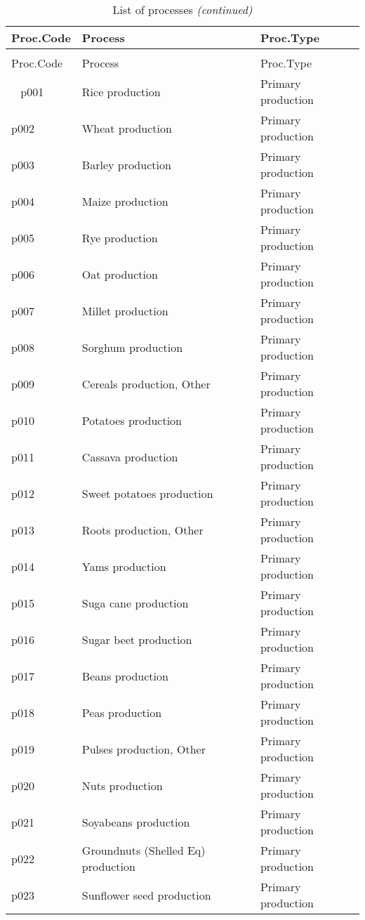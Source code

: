 \documentclass[]{article}
\begin{document}
\begin{longtable}[t]{lll}
\caption{\label{tab:table2}List of processes}\\
\toprule
Proc.Code & Process & Proc.Type\\
\midrule
\endfirsthead
\caption[]{List of processes \textit{(continued)}}\\
\toprule
Proc.Code & Process & Proc.Type\\
\midrule
\endhead
\
\endfoot
\bottomrule
\endlastfoot
p001 & Rice production & Primary production\\
p002 & Wheat production & Primary production\\
p003 & Barley production & Primary production\\
p004 & Maize production & Primary production\\
p005 & Rye production & Primary production\\
\addlinespace
p006 & Oat production & Primary production\\
p007 & Millet production & Primary production\\
p008 & Sorghum production & Primary production\\
p009 & Cereals production, Other & Primary production\\
p010 & Potatoes  production & Primary production\\
\addlinespace
p011 & Cassava production & Primary production\\
p012 & Sweet potatoes production & Primary production\\
p013 & Roots production, Other & Primary production\\
p014 & Yams production & Primary production\\
p015 & Suga cane production & Primary production\\
\addlinespace
p016 & Sugar beet production & Primary production\\
p017 & Beans production & Primary production\\
p018 & Peas production & Primary production\\
p019 & Pulses  production, Other & Primary production\\
p020 & Nuts production & Primary production\\
\addlinespace
p021 & Soyabeans production & Primary production\\
p022 & Groundnuts (Shelled Eq) production & Primary production\\
p023 & Sunflower seed production & Primary production\\

\end{longtable}
\end{document}
